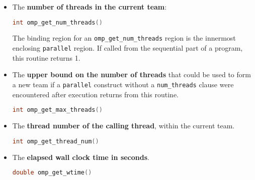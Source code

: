 \begin{itemize}
    \item The \textbf{number of threads in the current team}:
    \begin{openmpbox}
        \begin{lstlisting}[language=C++]
int omp_get_num_threads()\end{lstlisting}
    \end{openmpbox}
    The binding region for an \texttt{omp\_get\_num\_threads} region is the innermost enclosing \texttt{parallel} region. If called from the sequential part of a program, this routine returns 1.

    \newpage

    \item The \textbf{upper bound on the number of threads} that could be used to form a new team if a \texttt{parallel} construct without a \texttt{num\_threads} clause were encountered after execution returns from this routine.
    \begin{openmpbox}
        \begin{lstlisting}[language=C++]
int omp_get_max_threads()\end{lstlisting}
    \end{openmpbox}

    \item The \textbf{thread number of the calling thread}, within the current team.
    \begin{openmpbox}
        \begin{lstlisting}[language=C++]
int omp_get_thread_num()\end{lstlisting}
    \end{openmpbox}
    
    \item The \textbf{elapsed wall clock time in seconds}.
    \begin{openmpbox}
    	\begin{lstlisting}[language=C++]
double omp_get_wtime()\end{lstlisting}
    \end{openmpbox}
    

\end{itemize}
